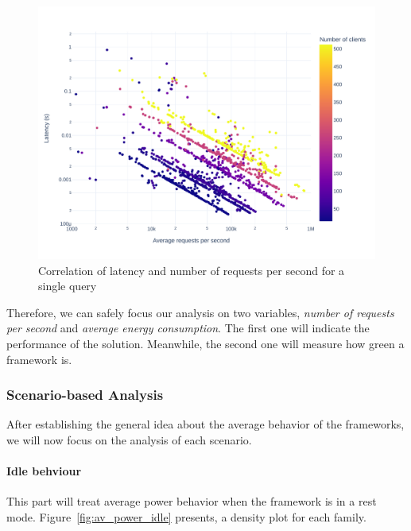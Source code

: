 \begin{figure}[!h]
    \centering
    \includegraphics[width=.9\columnwidth ]{imgs/scatter_db_latency_rps}
    \caption{Correlation of latency and number of requests per second for a single query}
    \label{fig:scatter_db}
\end{figure}

Therefore, we can safely focus our analysis on two variables, \emph{number of requests per second} and \emph{average energy consumption}. The first one will indicate the performance of the solution. Meanwhile, the second one will measure how green a framework is.






\subsubsection{Scenario-based Analysis}
After establishing the general idea about the average behavior of the frameworks, we will now focus on the analysis of each scenario.

\paragraph{Idle behviour}
This part will treat average power behavior when the framework is in a rest mode.
Figure~\ref{fig:av_power_idle} presents, a density plot for each family.


